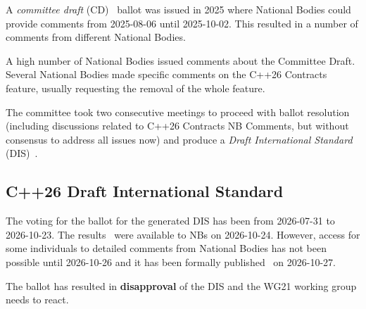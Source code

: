 A \emph{committee draft} (CD)~\cite{cpp26:cd} ballot was issued in 2025 where
National Bodies could provide comments from 2025-08-06 until 2025-10-02. This
resulted in a number of comments from different National Bodies. 

A high number of National Bodies issued comments about the Committee Draft.
Several National Bodies made specific comments on the C++26
Contracts~\cite{p2900r14} feature, usually requesting the removal of the whole
feature. 

The committee took two consecutive meetings to proceed with ballot resolution
(including discussions related to C++26 Contracts NB Comments, but without
consensus to address all issues now) and produce a \emph{Draft International
Standard} (DIS)~\cite{cpp26:dis}.

\subsection{C++26 Draft International Standard}

The voting for the ballot for the generated DIS has been from 2026-07-31 to
2026-10-23. The results~\cite{dis:results} were available to NBs on 2026-10-24.
However, access for some individuals to detailed comments from National
Bodies has not been possible until 2026-10-26 and it has been formally
published~\cite{sov:comments} on 2026-10-27.

The ballot has resulted in \textbf{disapproval} of the DIS and the WG21 working
group needs to react.
